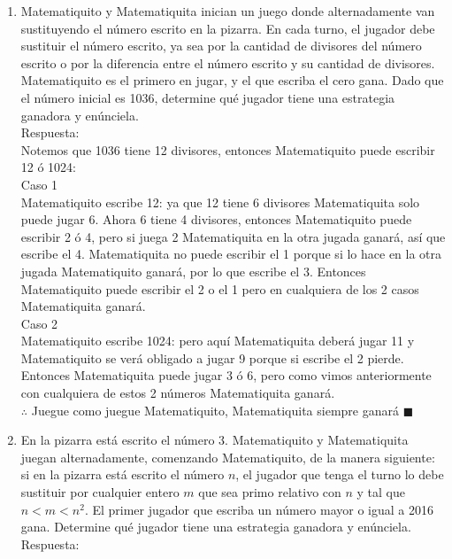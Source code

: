 \documentclass{book}
\begin{document}
\begin{enumerate}
        \item Matematiquito y Matematiquita inician un juego donde alternadamente van sustituyendo el número escrito en la pizarra. En cada turno, el jugador debe sustituir el número escrito, ya sea por la cantidad de divisores del número escrito o por la diferencia entre el número escrito y su cantidad de divisores. Matematiquito es el primero en jugar, y el que escriba el cero gana. Dado que el número inicial es 1036, determine qué jugador tiene una estrategia ganadora y enúnciela.\\
        Respuesta:\\
        Notemos que 1036 tiene 12 divisores, entonces Matematiquito puede escribir 12 ó 1024:\\
        Caso 1\\
        Matematiquito escribe 12: ya que 12 tiene 6 divisores Matematiquita solo puede jugar 6. Ahora 6 tiene 4 divisores, entonces Matematiquito puede escribir 2 ó 4, pero si juega 2 Matematiquita en la otra jugada ganará, así que escribe el 4. Matematiquita no puede escribir el 1 porque si lo hace en la otra jugada Matematiquito ganará, por lo que escribe el 3. Entonces Matematiquito puede escribir el 2 o el 1 pero en cualquiera de los 2 casos Matematiquita ganará. \\
        Caso 2\\
        Matematiquito escribe 1024: pero aquí Matematiquita deberá jugar 11 y Matematiquito se verá obligado a jugar 9 porque si escribe el 2 pierde. Entonces Matematiquita puede jugar 3 ó 6, pero como vimos anteriormente con cualquiera de estos 2 números Matematiquita ganará.\\
        $\therefore$ Juegue como juegue Matematiquito, Matematiquita siempre ganará $\blacksquare$\\
        \item En la pizarra está escrito el número 3. Matematiquito y Matematiquita juegan alternadamente, comenzando Matematiquito, de la manera siguiente: si en la pizarra está escrito el número $n$, el jugador que tenga el turno lo debe sustituir por cualquier entero $m$ que sea primo relativo con $n$ y tal que $n<m<n^2$. El primer jugador que escriba un número mayor o igual a 2016 gana. Determine qué jugador tiene una estrategia ganadora y enúnciela.
        \\Respuesta:\\

\end{enumerate}
\end{document}
